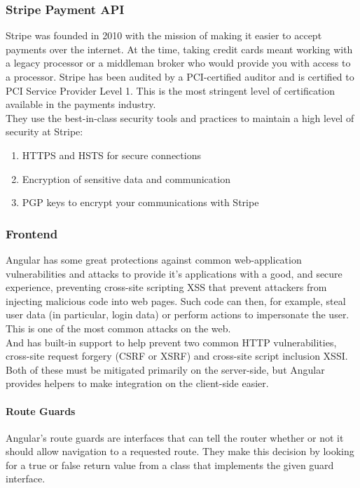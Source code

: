\subsubsection{Stripe Payment API}
Stripe was founded in 2010 with the mission of making it easier to accept payments over the internet. At the time, taking credit cards meant working with a legacy processor or a middleman broker who would provide you with access to a processor.
Stripe has been audited by a PCI-certified auditor and is certified to PCI Service Provider Level 1. This is the most stringent level of certification available in the payments industry. \\
They use the best-in-class security tools and practices to maintain a high level of security at Stripe:
\begin{enumerate}
      \item HTTPS and HSTS for secure connections
      \item Encryption of sensitive data and communication
      \item PGP keys to encrypt your communications with Stripe
\end{enumerate}
\subsubsection{Frontend}
Angular has some great protections against common web-application vulnerabilities and attacks to provide it's applications with a good, and secure experience, preventing cross-site scripting \ac{XSS} that prevent attackers from injecting malicious code into web pages. Such code can then, for example, steal user data (in particular, login data) or perform actions to impersonate the user. This is one of the most common attacks on the web.\\
And has built-in support to help prevent two common HTTP vulnerabilities, cross-site request forgery (\ac{CSRF} or XSRF) and cross-site script inclusion \ac{XSSI}. Both of these must be mitigated primarily on the server-side, but Angular provides helpers to make integration on the client-side easier.

\paragraph*{Route Guards}
Angular’s route guards are interfaces that can tell the router whether or not it should allow navigation to a requested route. They make this decision by looking for a true or false return value from a class that implements the given guard interface.
